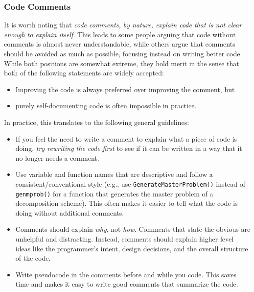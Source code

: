 \documentclass[12pt]{article}
\begin{document}
\subsubsection{Code Comments}
It is worth noting that \emph{code comments, by nature, explain code that is not clear enough to explain itself}. This leads to some people arguing that code without comments is almost never understandable, while others argue that comments should be avoided as much as possible, focusing instead on writing better code. While both positions are somewhat extreme, they hold merit in the sense that both of the following statements are widely accepted:
\begin{itemize}
    \item Improving the code is always preferred over improving the comment, but
    \item purely self-documenting code is often impossible in practice.
\end{itemize}
In practice, this translates to the following general guidelines:
\begin{itemize}
    \item If you feel the need to write a comment to explain what a piece of code is doing, \emph{try rewriting the code first} to see if it can be written in a way that it no longer needs a comment.
    \item Use variable and function names that are descriptive and follow a consistent/conventional style (e.g., use \texttt{GenerateMasterProblem()} instead of \texttt{genmprob()} for a function that generates the master problem of a decomposition scheme). This often makes it easier to tell what the code is doing without additional comments.
    \item Comments should explain \emph{why}, not \emph{how}. Comments that state the obvious are unhelpful and distracting. Instead, comments should explain higher level ideas like the programmer's intent, design decisions, and the overall structure of the code.
    \item Write pseudocode in the comments before and while you code. This saves time and makes it easy to write good comments that summarize the code.
\end{itemize}
\end{document}
